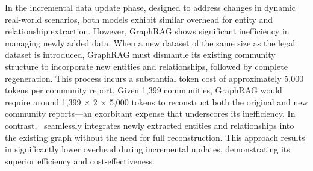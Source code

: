 In the incremental data update phase, designed to address changes in dynamic real-world scenarios, both models exhibit similar overhead for entity and relationship extraction. However, GraphRAG shows significant inefficiency in managing newly added data. When a new dataset of the same size as the legal dataset is introduced, GraphRAG must dismantle its existing community structure to incorporate new entities and relationships, followed by complete regeneration. This process incurs a substantial token cost of approximately 5,000 tokens per community report. Given 1,399 communities, GraphRAG would require around 1,399 × 2 × 5,000 tokens to reconstruct both the original and new community reports—an exorbitant expense that underscores its inefficiency. In contrast, \model\ seamlessly integrates newly extracted entities and relationships into the existing graph without the need for full reconstruction. This approach results in significantly lower overhead during incremental updates, demonstrating its superior efficiency and cost-effectiveness.

